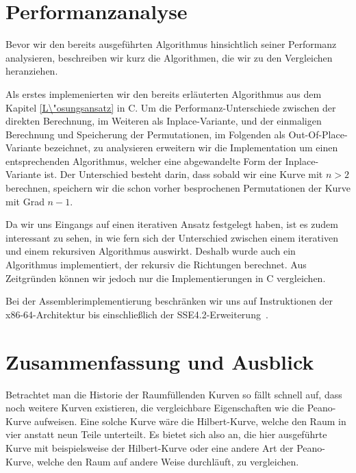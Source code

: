\documentclass[course=asp]{aspdoc}
\begin{document}
\newpage
\section{Performanzanalyse} \label{Performanzanalyse}
Bevor wir den bereits ausgef\"uhrten Algorithmus hinsichtlich seiner Performanz analysieren, beschreiben wir kurz die Algorithmen, die wir zu den Vergleichen heranziehen.

Als erstes implemenierten wir den bereits erl\"auterten Algorithmus aus dem Kapitel \ref{L\"osungsansatz} in C. Um die Performanz-Unterschiede zwischen der direkten Berechnung, im Weiteren als Inplace-Variante, und der einmaligen Berechnung und Speicherung der Permutationen, im Folgenden als Out-Of-Place-Variante bezeichnet, zu analysieren erweitern wir die Implementation um einen entsprechenden Algorithmus, welcher eine abgewandelte Form der Inplace-Variante ist. Der Unterschied besteht darin, dass sobald wir eine Kurve mit $n > 2$ berechnen, speichern wir die schon vorher besprochenen Permutationen der Kurve mit Grad $n - 1$. 

Da wir uns Eingangs auf einen iterativen Ansatz festgelegt haben, ist es zudem interessant zu sehen, in wie fern sich der Unterschied zwischen einem iterativen und einem rekursiven Algorithmus auswirkt. Deshalb wurde auch ein Algorithmus implementiert, der rekursiv die Richtungen berechnet. Aus Zeitgr\"unden k\"onnen wir jedoch nur die Implementierungen in C vergleichen. 


Bei der Assemblerimplementierung beschr\"anken wir uns auf Instruktionen der x86-64-Architektur bis einschlie\ss lich der SSE4.2-Erweiterung~\cite{intel2020man}.

\newpage
\section{Zusammenfassung und Ausblick} \label{Zusammenfassung und Ausblick}


Betrachtet man die Historie der Raumf\"ullenden Kurven so f\"allt schnell auf, dass noch weitere Kurven existieren, die vergleichbare Eigenschaften wie die Peano-Kurve aufweisen. Eine solche Kurve w\"are die Hilbert-Kurve, welche den Raum in vier anstatt neun Teile unterteilt. Es bietet sich also an, die hier ausgef\"uhrte Kurve mit beispielsweise der Hilbert-Kurve oder eine andere Art der Peano-Kurve, welche den Raum auf andere Weise durchl\"auft, zu vergleichen. %
\end{document}
